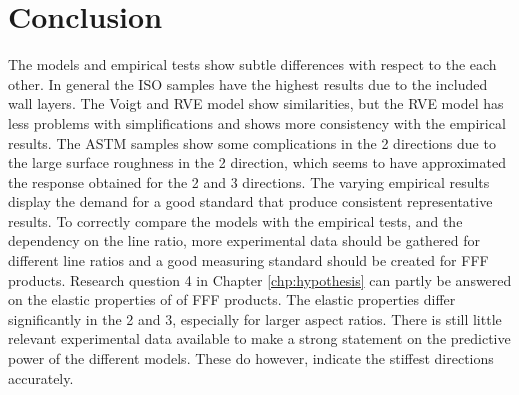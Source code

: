 \section{Conclusion}
The models and empirical tests show subtle differences with respect to the each other. In general the ISO samples have the highest results due to the included wall layers. The Voigt and RVE model show similarities, but the RVE model has less problems with simplifications and shows more consistency with the empirical results. The ASTM samples show some complications  in the 2 directions due to the large surface roughness in the 2 direction, which seems to have approximated the response obtained for the 2 and 3 directions.
The varying empirical results display the demand for a good standard that produce consistent representative results. To correctly compare the models with the empirical tests, and the dependency on the line ratio, more experimental data should be gathered for different line ratios and a good measuring standard should be created for FFF products.
Research question 4 in Chapter \ref{chp:hypothesis} can partly be answered on the elastic properties of of FFF products. The elastic properties differ significantly in the 2 and 3, especially for larger aspect ratios. There is still little relevant experimental data available to make a strong statement on the predictive power of the different models. These do however, indicate the stiffest directions accurately. 


